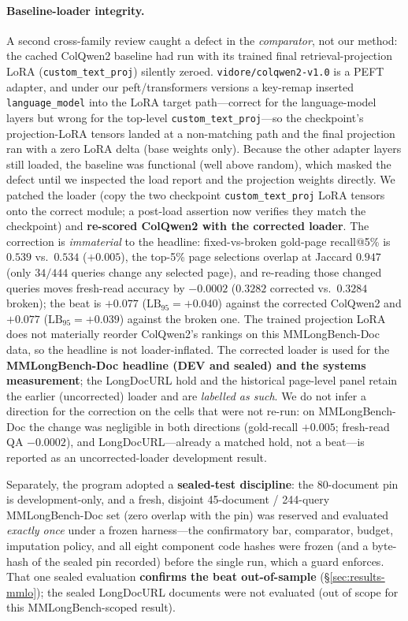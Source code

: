 \documentclass[letterpaper]{article} %
\newcommand{\lb}{\mathrm{LB}_{95}}
\begin{document}
\paragraph{Baseline-loader integrity.} A second cross-family review caught a defect in the \emph{comparator}, not our method: the cached ColQwen2 baseline had run with its trained final retrieval-projection LoRA (\texttt{custom\_text\_proj}) silently zeroed. \texttt{vidore/colqwen2-v1.0} is a PEFT adapter, and under our peft/transformers versions a key-remap inserted \texttt{language\_model} into the LoRA target path---correct for the language-model layers but wrong for the top-level \texttt{custom\_text\_proj}---so the checkpoint's projection-LoRA tensors landed at a non-matching path and the final projection ran with a zero LoRA delta (base weights only). Because the other adapter layers still loaded, the baseline was functional (well above random), which masked the defect until we inspected the load report and the projection weights directly. We patched the loader (copy the two checkpoint \texttt{custom\_text\_proj} LoRA tensors onto the correct module; a post-load assertion now verifies they match the checkpoint) and \textbf{re-scored ColQwen2 with the corrected loader}. The correction is \emph{immaterial} to the headline: fixed-vs-broken gold-page recall@5\% is $0.539$ vs.\ $0.534$ ($+0.005$), the top-5\% page selections overlap at Jaccard $0.947$ (only $34/444$ queries change any selected page), and re-reading those changed queries moves fresh-read accuracy by $-0.0002$ ($0.3282$ corrected vs.\ $0.3284$ broken); the beat is $+0.077$ ($\lb=+0.040$) against the corrected ColQwen2 and $+0.077$ ($\lb=+0.039$) against the broken one. The trained projection LoRA does not materially reorder ColQwen2's rankings on this MMLongBench-Doc data, so the headline is not loader-inflated. The corrected loader is used for the \textbf{MMLongBench-Doc headline (DEV and sealed) and the systems measurement}; the LongDocURL hold and the historical page-level panel retain the earlier (uncorrected) loader and are \emph{labelled as such}. We do not infer a direction for the correction on the cells that were not re-run: on MMLongBench-Doc the change was negligible in both directions (gold-recall $+0.005$; fresh-read QA $-0.0002$), and LongDocURL---already a matched hold, not a beat---is reported as an uncorrected-loader development result.

Separately, the program adopted a \textbf{sealed-test discipline}: the 80-document pin is development-only, and a fresh, disjoint 45-document / 244-query MMLongBench-Doc set (zero overlap with the pin) was reserved and evaluated \emph{exactly once} under a frozen harness---the confirmatory bar, comparator, budget, imputation policy, and all eight component code hashes were frozen (and a byte-hash of the sealed pin recorded) before the single run, which a guard enforces. That one sealed evaluation \textbf{confirms the beat out-of-sample} (\S\ref{sec:results-mmlo}); the sealed LongDocURL documents were not evaluated (out of scope for this MMLongBench-scoped result).
\end{document}
